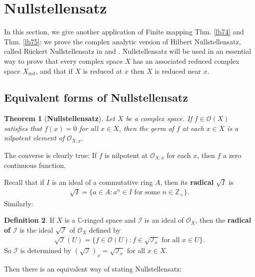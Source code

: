 \documentclass[12pt,b5paper,notitlepage]{report}
\theoremstyle{definition}
\newtheorem{df}{Definition}[section]
\theoremstyle{plain}
\newtheorem{thm}[df]{Theorem}
\newcommand{\mc}{\mathcal}
\newcommand{\scr}{\mathscr}
\newcommand{\Cbb}{\mathbb C}
\newcommand{\Zbb}{\mathbb Z}
\newcommand{\red}{\mathrm{red}}
\numberwithin{equation}{section}
\begin{document}
\section{Nullstellensatz}


In this section, we give another application of Finite mapping Thm. \ref{lb74} and Thm. \ref{lb75}: we prove the complex analytic version of Hilbert Nullstellensatz, called R\"uckert Nullstellensatz in \cite{GR-b} and \cite{GPR}. Nullstellensatz will be used in an essential way to prove that every complex space $X$ has an associated reduced complex space $X_\red$, and that if $X$ is reduced at $x$ then $X$ is reduced near $x$. 





\subsection{Equivalent forms of Nullstellensatz}


\begin{thm}[\textbf{Nullstellensatz}]\label{lb114}
Let $X$ be a complex space. If $f\in\scr O(X)$ satisfies that $f(x)=0$ for all $x\in X$, then the germ of $f$ at each $x\in X$ is a nilpotent element of $\scr O_{X,x}$.
\end{thm}

The converse is clearly true: If $f$ is nilpotent at $\scr O_{X,x}$ for each $x$, then $f$ a zero continuous function.

Recall that if $I$ is an ideal of a commutative ring $A$, then its \textbf{radical} $\sqrt I$ is
\begin{align*}
\sqrt I=\{a\in A:a^n\in I\text{ for some }n\in\Zbb_+\}.
\end{align*}
Similarly: \index{00@Radicals $\sqrt I,\sqrt{\mc I}$}

\begin{df}
If $X$ is a $\Cbb$-ringed space and $\mc I$ is an ideal of $\scr O_X$, then the \textbf{radical of $\mc I$} is the ideal $\sqrt{\mc I}$ of $\scr O_X$ defined by
\begin{align*}
\sqrt{\mc I}(U)=\{f\in\scr O(U):f\in\sqrt{\mc I_x}\text{ for all }x\in U\}.
\end{align*}
So $\mc I$ is determined by $(\sqrt{\mc I})_x=\sqrt{\mc I_x}$ for all $x\in X$.
\end{df}

Then there is an equivalent way of stating Nullstellensatz: 
\end{document}

